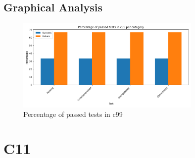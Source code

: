 \documentclass{article}
\begin{document}
\subsection{Graphical Analysis}
\begin{figure}[h!]
\centering
\includegraphics[width=0.8\textwidth]{../reports/clava/images/c99_percentage.png}
\caption{Percentage of passed tests in c99}
\label{fig:c99_percentage}
\end{figure}
\newpage
\section{C11}
\end{document}
